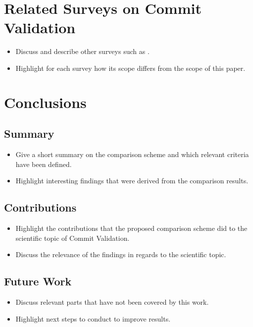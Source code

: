 \section{Related Surveys on Commit Validation}
\label{sec:relatedsurveys}
\begin{itemize}
	\item Discuss and describe other surveys such as \cite{Kim2008,Catolino2019,Syed2019,Yang2016}.
	\item Highlight for each survey how its scope differs from the scope of this paper.
\end{itemize}


\section{Conclusions}
\label{sec:conclusions}

\subsection{Summary}
\begin{itemize}
	\item Give a short summary on the comparison scheme and which relevant criteria have been defined.
	\item Highlight interesting findings that were derived from the comparison results.
\end{itemize}

\subsection{Contributions}
\begin{itemize}
	\item Highlight the contributions that the proposed comparison scheme did to the scientific topic of Commit Validation.
	\item Discuss the relevance of the findings in regards to the scientific topic.
\end{itemize}

\subsection{Future Work}
\begin{itemize}
	\item Discuss relevant parts that have not been covered by this work.
	\item Highlight next steps to conduct to improve results.
\end{itemize}
